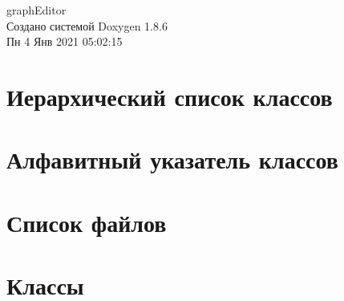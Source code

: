 \documentclass[twoside]{book}
\newcommand{\clearemptydoublepage}{%
  \newpage{\pagestyle{empty}\cleardoublepage}%
}
\begin{document}
\hypersetup{pageanchor=false}
\begin{titlepage}
\vspace*{7cm}
\begin{center}%
{\Large graph\-Editor }\\
\vspace*{1cm}
{\large Создано системой Doxygen 1.8.6}\\
\vspace*{0.5cm}
{\small Пн 4 Янв 2021 05:02:15}\\
\end{center}
\end{titlepage}
\clearemptydoublepage
\tableofcontents
\clearemptydoublepage
{}
\hypersetup{pageanchor=true}

\chapter{Иерархический список классов}

\chapter{Алфавитный указатель классов}

\chapter{Список файлов}

\chapter{Классы}



































\end{document}
